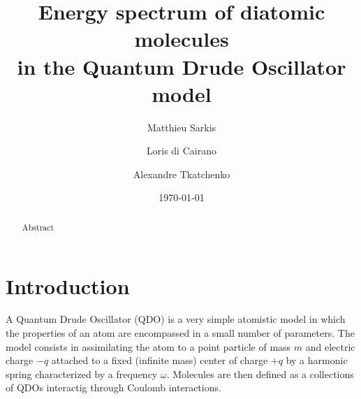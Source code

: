\documentclass[reprint, amsmath, amssymb, aps, prl]{revtex4-2}
\begin{document}

\title{Energy spectrum of diatomic molecules\\ in the Quantum Drude Oscillator model}

\author{Matthieu Sarkis}

\author{Loris di Cairano}%

\author{Alexandre Tkatchenko}%



\date{\today}

\begin{abstract}
Abstract
\end{abstract}

\maketitle


\section{Introduction}

    A Quantum Drude Oscillator (QDO) is a very simple atomistic model in which the properties of an atom are encompassed in a small number of parameters. The model consists in assimilating the atom to a point particle of mass $m$ and electric charge $-q$ attached to a fixed (infinite mass) center of charge $+q$ by a harmonic spring characterized by a frequency $\omega$. Molecules are then defined as a collections of QDOs interactig through Coulomb interactions.
\end{document}
